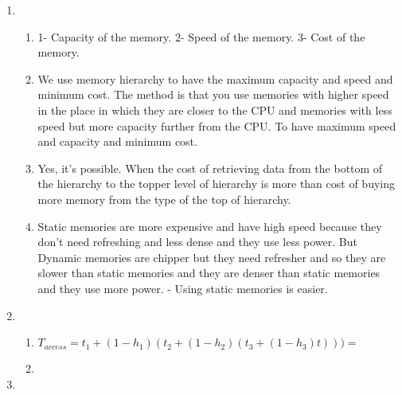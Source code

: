 \documentclass[12pt]{article}
\begin{document}
\begin{enumerate}
\begin{center}
\begin{tabular}{|c|c|c|c|c|}
	\end{tabular}		
	\end{center}
	\item
		\begin{enumerate}
		\item
		1- Capacity of the memory.
		2- Speed of the memory.
		3- Cost of the memory.
		\item
		We use memory hierarchy to have the maximum capacity and speed and minimum cost. The method is that you use memories with higher speed in the place in which they are closer to the CPU and memories with less speed but more capacity further from the CPU. To have maximum speed and capacity and minimum cost.
		\item
		Yes, it's possible. When the cost of retrieving data from the bottom of the hierarchy to the topper level of hierarchy is more than cost of buying more memory from the type of the top of hierarchy. 
		\item
		Static memories are more expensive and have high speed because they don't need refreshing and less dense and they use less power. But Dynamic memories are chipper but they need refresher and so they are slower than static memories and they are denser than static memories and they use more power. - Using static memories is easier.
		\end{enumerate}
		\item
		\begin{enumerate}
		\item
		$T_{access}=t_1+(1-h_1)(t_2+(1-h_2)(t_3+(1-h_3)t)))=$		
		\item
		\end{enumerate}
		\item

		
	\end{enumerate}
	
\end{document}

